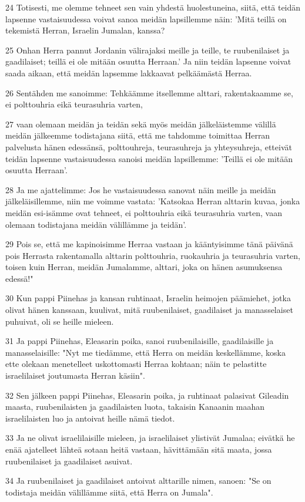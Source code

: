 \par 24 Totisesti, me olemme tehneet sen vain yhdestä huolestuneina, siitä, että teidän lapsenne vastaisuudessa voivat sanoa meidän lapsillemme näin: 'Mitä teillä on tekemistä Herran, Israelin Jumalan, kanssa?
\par 25 Onhan Herra pannut Jordanin välirajaksi meille ja teille, te ruubenilaiset ja gaadilaiset; teillä ei ole mitään osuutta Herraan.' Ja niin teidän lapsenne voivat saada aikaan, että meidän lapsemme lakkaavat pelkäämästä Herraa.
\par 26 Sentähden me sanoimme: Tehkäämme itsellemme alttari, rakentakaamme se, ei polttouhria eikä teurasuhria varten,
\par 27 vaan olemaan meidän ja teidän sekä myös meidän jälkeläistemme välillä meidän jälkeemme todistajana siitä, että me tahdomme toimittaa Herran palvelusta hänen edessänsä, polttouhreja, teurasuhreja ja yhteysuhreja, etteivät teidän lapsenne vastaisuudessa sanoisi meidän lapsillemme: 'Teillä ei ole mitään osuutta Herraan'.
\par 28 Ja me ajattelimme: Jos he vastaisuudessa sanovat näin meille ja meidän jälkeläisillemme, niin me voimme vastata: 'Katsokaa Herran alttarin kuvaa, jonka meidän esi-isämme ovat tehneet, ei polttouhria eikä teurasuhria varten, vaan olemaan todistajana meidän välillämme ja teidän'.
\par 29 Pois se, että me kapinoisimme Herraa vastaan ja kääntyisimme tänä päivänä pois Herrasta rakentamalla alttarin polttouhria, ruokauhria ja teurasuhria varten, toisen kuin Herran, meidän Jumalamme, alttari, joka on hänen asumuksensa edessä!"
\par 30 Kun pappi Piinehas ja kansan ruhtinaat, Israelin heimojen päämiehet, jotka olivat hänen kanssaan, kuulivat, mitä ruubenilaiset, gaadilaiset ja manasselaiset puhuivat, oli se heille mieleen.
\par 31 Ja pappi Piinehas, Eleasarin poika, sanoi ruubenilaisille, gaadilaisille ja manasselaisille: "Nyt me tiedämme, että Herra on meidän keskellämme, koska ette olekaan menetelleet uskottomasti Herraa kohtaan; näin te pelastitte israelilaiset joutumasta Herran käsiin".
\par 32 Sen jälkeen pappi Piinehas, Eleasarin poika, ja ruhtinaat palasivat Gileadin maasta, ruubenilaisten ja gaadilaisten luota, takaisin Kanaanin maahan israelilaisten luo ja antoivat heille nämä tiedot.
\par 33 Ja ne olivat israelilaisille mieleen, ja israelilaiset ylistivät Jumalaa; eivätkä he enää ajatelleet lähteä sotaan heitä vastaan, hävittämään sitä maata, jossa ruubenilaiset ja gaadilaiset asuivat.
\par 34 Ja ruubenilaiset ja gaadilaiset antoivat alttarille nimen, sanoen: "Se on todistaja meidän välillämme siitä, että Herra on Jumala".

